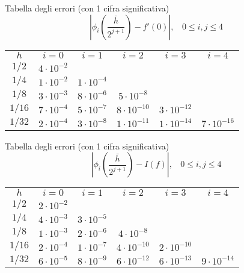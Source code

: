 \documentclass[12pt,a4paper]{article}
\begin{document}
Tabella degli errori (con 1 cifra significativa)
\begin{equation*}
    \left|\phi_i\left(\frac{\bar{h}}{2^{j+1}}\right)-f'(0)\right|,\  \  \  \ 0\leq i,j\leq4
\end{equation*}

\begin{table}[H]
\centering
\begin{tabular}{cccccc}
$h$ & $i=0$ & $i=1$ & $i=2$ & $i=3$ & $i=4$ \\  \cline{1-6} 

$1/2$ & $4\cdot10^{-2}$ \\ 

$1/4$ & $1\cdot10^{-2}$ & $1\cdot10^{-4}$  \\

$1/8$ & $3\cdot10^{-3}$ & $8\cdot10^{-6}$ & $5\cdot10^{-8}$ \\

$1/16$ & $7\cdot10^{-4}$ & $5\cdot10^{-7}$ & $8\cdot10^{-10}$ & $3\cdot10^{-12}$  \\

$1/32$ & $2\cdot10^{-4}$ & $3\cdot10^{-8}$ & $1\cdot10^{-11}$ & $1\cdot10^{-14}$ & $7\cdot10^{-16}$ \\

\end{tabular}
\end{table}

Tabella degli errori (con 1 cifra significativa)
\begin{equation*}
    \left|\phi_i\left(\frac{\bar{h}}{2^{j+1}}\right)-I(f)\right|,\  \  \  \ 0\leq i,j\leq4
\end{equation*}
\begin{table}[H]
\centering
\begin{tabular}{cccccc}
$h$ & $i=0$ & $i=1$ & $i=2$ & $i=3$ & $i=4$ \\  \cline{1-6} 

$1/2$ & $2\cdot10^{-2}$ \\ 

$1/4$ & $4\cdot10^{-3}$ & $3\cdot10^{-5}$  \\

$1/8$ & $1\cdot10^{-3}$ & $2\cdot10^{-6}$ & $4\cdot10^{-8}$ \\

$1/16$ & $2\cdot10^{-4}$ & $1\cdot10^{-7}$ & $4\cdot10^{-10}$ & $2\cdot10^{-10}$  \\

$1/32$ & $6\cdot10^{-5}$ & $8\cdot10^{-9}$ & $6\cdot10^{-12}$ & $6\cdot10^{-13}$ & $9\cdot10^{-14}$ \\

\end{tabular}
\end{table}
\end{document}
